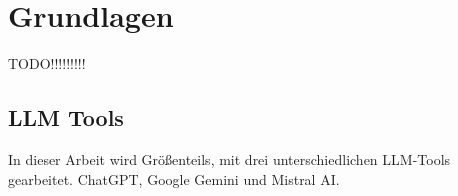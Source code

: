 
\chapter{Grundlagen} 

TODO!!!!!!!!!

\section{LLM Tools}  \label{LLM Tools}

In dieser Arbeit wird Größenteils, mit drei unterschiedlichen LLM-Tools gearbeitet. ChatGPT, Google Gemini und Mistral AI.